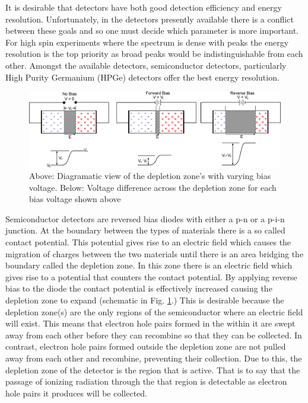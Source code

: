 It is desirable that \gr{} detectors have both good detection efficiency and energy resolution. Unfortunately, in the \gr{} detectors presently available there is a conflict between these goals and so one must decide which parameter is more important. For high spin experiments where the spectrum is dense with peaks the energy resolution is the top priority as broad peaks would be indistinguishable from each other. Amongst the available detectors, semiconductor detectors, particularly High Purity Germanium (HPGe) detectors offer the best energy resolution.

\begin{figure}
	\centerline{\includegraphics[width=\textwidth]{./img/c3/pn-diode.eps}}
	\caption{Above: Diagramatic view of the depletion zone's with varying bias voltage. Below: Voltage difference across the depletion zone for each bias voltage shown above}
	\label{fig:chp3-pn_diode}
\end{figure}


Semiconductor detectors are reversed bias diodes with either a p-n or a p-i-n junction. At the boundary between the types of materials there is a so called contact potential. This potential gives rise to an electric field which causes the migration of charges between the two materials until there is an area bridging the boundary called the depletion zone. In this zone there is an electric field which gives rise to a potential that counters the contact potential. By applying reverse bias to the diode the contact potential is effectively increased causing the depletion zone to expand (schematic in Fig. \ref{fig:chp3-pn_diode}.) This is desirable because the depletion zone(s) are the only regions of the semiconductor where an electric field will exist. This means that electron hole pairs formed in the within it are swept away from each other before they can recombine so that they can be collected. In contrast, electron hole pairs formed outside the depletion zone are not pulled away from each other and recombine, preventing their collection. Due to this, the depletion zone of the detector is the region that is active. That is to say that the passage of ionizing radiation through the that region is detectable as electron hole pairs it produces will be collected.

